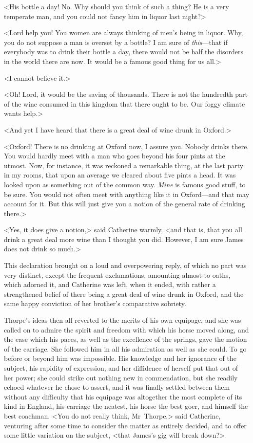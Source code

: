  <His bottle a day! No. Why should you think of such a thing? He is a very temperate man, and you could not fancy him in liquor last night?> 

 <Lord help you! You women are always thinking of men's being in liquor. Why, you do not suppose a man is overset by a bottle? I am sure of \textit{this}—that if everybody was to drink their bottle a day, there would not be half the disorders in the world there are now. It would be a famous good thing for us all.> 

 <I cannot believe it.> 

 <Oh! Lord, it would be the saving of thousands. There is not the hundredth part of the wine consumed in this kingdom that there ought to be. Our foggy climate wants help.> 

 <And yet I have heard that there is a great deal of wine drunk in Oxford.> 

 <Oxford! There is no drinking at Oxford now, I assure you. Nobody drinks there. You would hardly meet with a man who goes beyond his four pints at the utmost. Now, for instance, it was reckoned a remarkable thing, at the last party in my rooms, that upon an average we cleared about five pints a head. It was looked upon as something out of the common way. \textit{Mine} is famous good stuff, to be sure. You would not often meet with anything like it in Oxford—and that may account for it. But this will just give you a notion of the general rate of drinking there.> 

 <Yes, it does give a notion,> said Catherine warmly, <and that is, that you all drink a great deal more wine than I thought you did. However, I am sure James does not drink so much.> 

 This declaration brought on a loud and overpowering reply, of which no part was very distinct, except the frequent exclamations, amounting almost to oaths, which adorned it, and Catherine was left, when it ended, with rather a strengthened belief of there being a great deal of wine drunk in Oxford, and the same happy conviction of her brother's comparative sobriety. 

 Thorpe's ideas then all reverted to the merits of his own equipage, and she was called on to admire the spirit and freedom with which his horse moved along, and the ease which his paces, as well as the excellence of the springs, gave the motion of the carriage. She followed him in all his admiration as well as she could. To go before or beyond him was impossible. His knowledge and her ignorance of the subject, his rapidity of expression, and her diffidence of herself put that out of her power; she could strike out nothing new in commendation, but she readily echoed whatever he chose to assert, and it was finally settled between them without any difficulty that his equipage was altogether the most complete of its kind in England, his carriage the neatest, his horse the best goer, and himself the best coachman. <You do not really think, Mr~Thorpe,> said Catherine, venturing after some time to consider the matter as entirely decided, and to offer some little variation on the subject, <that James's gig will break down?> 

